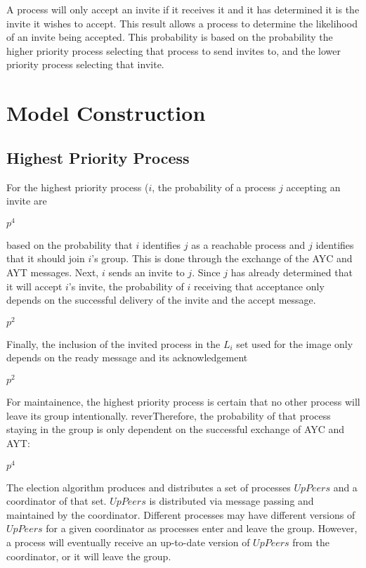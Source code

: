 A process will only accept an invite if it receives it and it has determined it is the invite it wishes to accept.
This result allows a process to determine the likelihood of an invite being accepted.
This probability is based on the probability the higher priority process selecting that process to send invites to, and the lower priority process selecting that invite.

\section{Model Construction}

\subsection{Highest Priority Process}
For the highest priority process ($i$, the probability of a process $j$ accepting an invite are

$p^4$

based on the probability that $i$ identifies $j$ as a reachable process and $j$ identifies that it should join $i$'s group.
This is done through the exchange of the \ac{AYC} and \ac{AYT} messages.
Next, $i$ sends an invite to $j$.
Since $j$ has already determined that it will accept $i$'s invite, the probability of $i$ receiving that acceptance only depends on the successful delivery of the invite and the accept message.

$p^2$

Finally, the inclusion of the invited process in the $L_i$ set used for the image only depends on the ready message and its acknowledgement

$p^2$

For maintainence, the highest priority process is certain that no other process will leave its group intentionally.
reverTherefore, the probability of that process staying in the group is only dependent on the successful exchange of \ac{AYC} and \ac{AYT}:

$p^4$

The election algorithm produces and distributes a set of processes $UpPeers$ and a coordinator of that set.
$UpPeers$ is distributed via message passing and maintained by the coordinator.
Different processes may have different versions of $UpPeers$ for a given coordinator as processes enter and leave the group.
However, a process will eventually receive an up-to-date version of $UpPeers$ from the coordinator, or it will leave the group.

